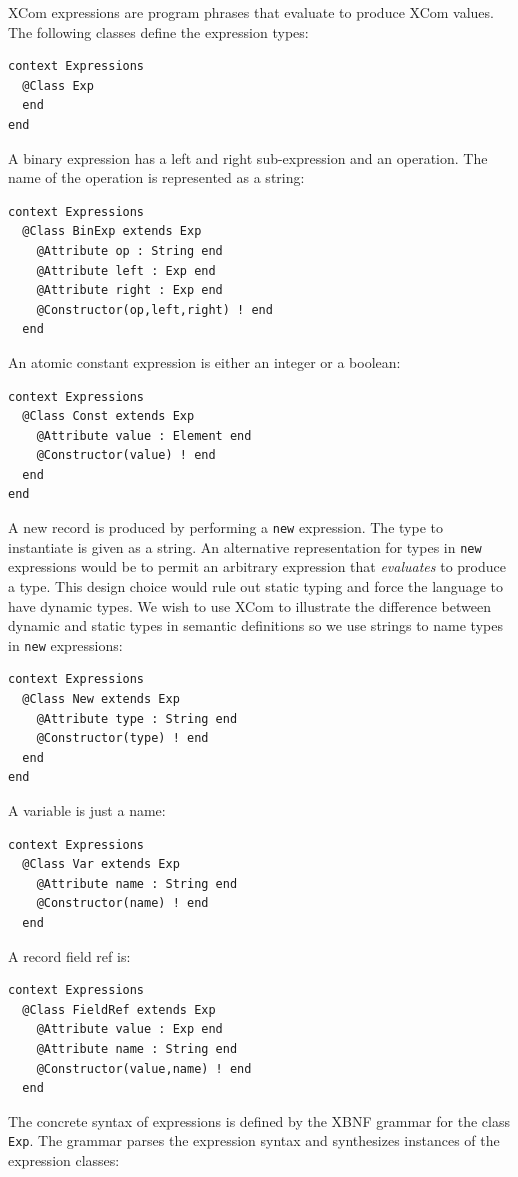 \documentclass{article}
\begin{document}
XCom expressions are program phrases that evaluate to produce XCom values. The following classes
define the expression types:
\begin{verbatim}
context Expressions
  @Class Exp
  end
end
\end{verbatim}
A binary expression has a left and right sub-expression and an operation. The name of the operation
is represented as a string:
\begin{verbatim}
context Expressions
  @Class BinExp extends Exp
    @Attribute op : String end
    @Attribute left : Exp end
    @Attribute right : Exp end
    @Constructor(op,left,right) ! end
  end
\end{verbatim}
An atomic constant expression is either an integer or a boolean:
\begin{verbatim}
context Expressions
  @Class Const extends Exp
    @Attribute value : Element end
    @Constructor(value) ! end
  end
end
\end{verbatim}
A new record is produced by performing a {\tt new} expression. The type to instantiate is
given as a string. An alternative representation for types in {\tt new} expressions would
be to permit an arbitrary expression that {\em evaluates} to produce a type. This design choice
would rule out static typing and force the language to have dynamic types. We wish to use
XCom to illustrate the difference between dynamic and static types in semantic definitions
so we use strings to name types in {\tt new} expressions:
\begin{verbatim}
context Expressions
  @Class New extends Exp
    @Attribute type : String end
    @Constructor(type) ! end
  end
end
\end{verbatim}
A variable is just a name:
\begin{verbatim}
context Expressions
  @Class Var extends Exp
    @Attribute name : String end
    @Constructor(name) ! end
  end
\end{verbatim}
A record field ref is:
\begin{verbatim}
context Expressions
  @Class FieldRef extends Exp
    @Attribute value : Exp end
    @Attribute name : String end
    @Constructor(value,name) ! end
  end
\end{verbatim}
The concrete syntax of expressions is defined by the XBNF grammar for the class {\tt Exp}.
The grammar parses the expression syntax and synthesizes instances of the expression classes:
\end{document}
